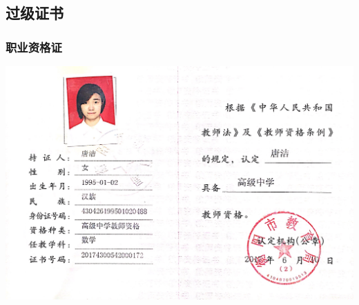\documentclass[UFT8]{ctexart}%
\begin{document}
%
%  
%  




\subsection{过级证书}
\subsubsection{职业资格证}
\begin{center}
\includegraphics[scale=0.18]{figs/教师资格证.jpg }
\end{center}
\end{document}
